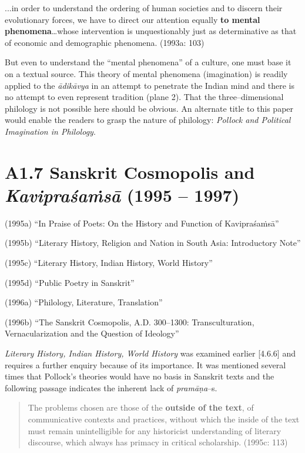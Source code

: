 \begin{myquote}
...in order to understand the ordering of human societies and to discern their evolutionary forces, we have to direct our attention equally \textbf{to mental phenomena}…whose intervention is unquestionably just as determinative as that of economic and demographic phenomena. (1993a: 103)
\end{myquote}

But even to understand the “mental phenomena” of a culture, one must base it on a textual source. This theory of mental phenomena (imagination) is readily applied to the \textit{ādikāvya} in an attempt to penetrate the Indian mind and there is no attempt to even represent tradition (plane 2). That the three–dimensional philology is not possible here should be obvious. An alternate title to this paper would enable the readers to grasp the nature of philology: \textit{Pollock and Political Imagination in Philology}.


\section*{A1.7 Sanskrit Cosmopolis and \textit{Kavipraśaṁsā} (1995 – 1997)}

\item (1995a) “In Praise of Poets: On the History and Function of Kavipraśaṁsā”

 \item (1995b) “Literary History, Religion and Nation in South Asia: Introductory Note”

 \item (1995c) “Literary History, Indian History, World History”

 \item (1995d) “Public Poetry in Sanskrit”

 \item (1996a) “Philology, Literature, Translation”

 \item (1996b) “The Sanskrit Cosmopolis, A.D. 300–1300: Transculturation, Vernacularization and the Question of Ideology”

\textit{Literary History, Indian History, World History }was examined earlier [4.6.6] and requires a further enquiry because of its importance. It was mentioned several times that Pollock’s theories would have no basis in Sanskrit texts and the following passage indicates the inherent lack of \textit{pramāṇa}–s.

\begin{verse}
The problems chosen are those of the \textbf{outside of the text}, of communicative contexts and practices, without which the inside of the text must remain unintelligible for any historicist understanding of literary discourse, which always has primacy in critical scholarship. (1995c: 113)
\end{verse}


